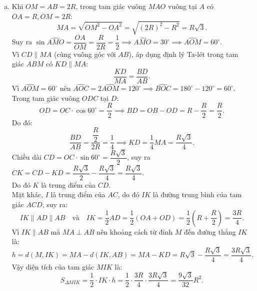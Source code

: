 \begin{bt}
{\begin{enumerate}[a)]
	$$ MC^2 = MI \cdot MO. $$
	\item Khi $OM = AB = 2R$, trong tam giác vuông $MAO$ vuông tại $A$ có $OA = R, OM = 2R$:
	$$ MA = \sqrt{OM^2 - OA^2} = \sqrt{(2R)^2 - R^2} = R\sqrt{3}. $$
	Suy ra $\sin \widehat{AMO} = \dfrac{OA}{OM} = \dfrac{R}{2R} = \dfrac{1}{2} \implies \widehat{AMO} = 30^\circ \implies \widehat{AOM} = 60^\circ$.\\
	Vì $CD \parallel MA$ (cùng vuông góc với $AB$), áp dụng định lý Ta-lét trong tam giác $ABM$ có $KD \parallel MA$:
	$$ \dfrac{KD}{MA} = \dfrac{BD}{AB}. $$
	Vì $\widehat{AOM} = 60^\circ$ nên $\widehat{AOC} = 2\widehat{AOM} = 120^\circ \implies \widehat{BOC} = 180^\circ - 120^\circ = 60^\circ$.\\
	Trong tam giác vuông $ODC$ tại $D$:
	$$ OD = OC \cdot \cos 60^\circ = \dfrac{R}{2} \implies BD = OB - OD = R - \dfrac{R}{2} = \dfrac{R}{2}. $$
	Do đó:
	$$ \dfrac{BD}{AB} = \dfrac{\dfrac{R}{2}}{2R} = \dfrac{1}{4} \implies KD = \dfrac{1}{4}MA = \dfrac{R\sqrt{3}}{4}. $$
	Chiều dài $CD = OC \cdot \sin 60^\circ = \dfrac{R\sqrt{3}}{2}$, suy ra $CK = CD - KD = \dfrac{R\sqrt{3}}{2} - \dfrac{R\sqrt{3}}{4} = \dfrac{R\sqrt{3}}{4}$.\\
	Do đó $K$ là trung điểm của $CD$.\\
	Mặt khác, $I$ là trung điểm của $AC$, do đó $IK$ là đường trung bình của tam giác $ACD$, suy ra:
	$$ IK \parallel AD \parallel AB \quad \text{và} \quad IK = \dfrac{1}{2}AD = \dfrac{1}{2}(OA + OD) = \dfrac{1}{2}\left(R + \dfrac{R}{2}\right) = \dfrac{3R}{4}. $$
	Vì $IK \parallel AB$ mà $MA \perp AB$ nên khoảng cách từ đỉnh $M$ đến đường thẳng $IK$ là:
	$$ h = d(M, IK) = MA - d(IK, AB) = MA - KD = R\sqrt{3} - \dfrac{R\sqrt{3}}{4} = \dfrac{3R\sqrt{3}}{4}. $$
	Vậy diện tích của tam giác $MIK$ là:
	$$ S_{\Delta MIK} = \dfrac{1}{2} \cdot IK \cdot h = \dfrac{1}{2} \cdot \dfrac{3R}{4} \cdot \dfrac{3R\sqrt{3}}{4} = \dfrac{9\sqrt{3}}{32}R^2. $$
\end{enumerate}
}
\end{bt}
